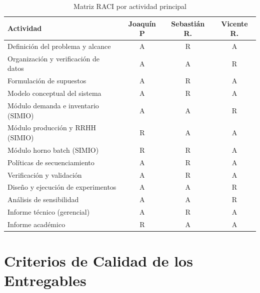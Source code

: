 \documentclass[12pt]{article}
\begin{document}
\begin{table}[H]
\centering
\caption{Matriz RACI por actividad principal}
\label{tab:raci}
\renewcommand{\arraystretch}{1.35}
\begin{tabularx}{\textwidth}{Xccc}
\toprule
\rowcolor{tabhead}
\color{white}\textbf{Actividad} &
\color{white}\textbf{Joaquín P} &
\color{white}\textbf{Sebastián R.} &
\color{white}\textbf{Vicente R.}  \\
\midrule
\rowcolor{tabrow}
Definición del problema y alcance   & A & R & A  \\
Organización y verificación de datos & A & A & R  \\
\rowcolor{tabrow}
Formulación de supuestos             & A & R & A  \\
Modelo conceptual del sistema        & A & R & A  \\
\rowcolor{tabrow}
Módulo demanda e inventario (SIMIO)  & A & A & R  \\
Módulo producción y RRHH (SIMIO)     & R & A & A  \\
\rowcolor{tabrow}
Módulo horno batch (SIMIO)           & R & R & A  \\
Políticas de secuenciamiento         & A & R & A  \\
\rowcolor{tabrow}
Verificación y validación            & A & R & A  \\
Diseño y ejecución de experimentos   & A & A & R  \\
\rowcolor{tabrow}
Análisis de sensibilidad             & A & A & R  \\
Informe técnico (gerencial)          & A & R & A  \\
\rowcolor{tabrow}
Informe académico                    & R & A & A  \\
\bottomrule
\end{tabularx}
\end{table}

\newpage
\newpage

\section{Criterios de Calidad de los Entregables}
\end{document}
